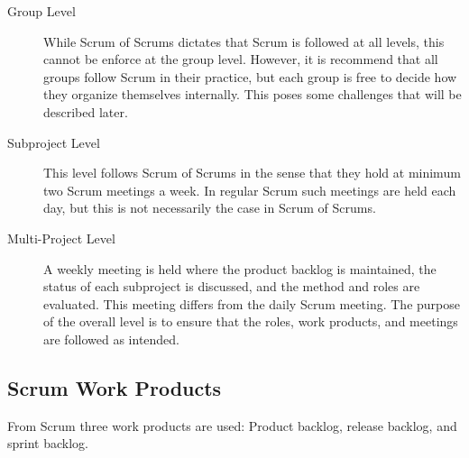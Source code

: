 \begin{description}
	\item[Group Level] While Scrum of Scrums dictates that Scrum is followed at all levels, this cannot be enforce at the group level. However, it is recommend that all groups follow Scrum in their practice, but each group is free to decide how they organize themselves internally. This poses some challenges that will be described later.
	\item[Subproject Level] This level follows Scrum of Scrums in the sense that they hold at minimum two Scrum meetings a week. In regular Scrum such meetings are held each day, but this is not necessarily the case in Scrum of Scrums.
	\item[Multi-Project Level] A weekly meeting is held where the product backlog is maintained, the status of each subproject is discussed, and the method and roles are evaluated. This meeting differs from the daily Scrum meeting. The purpose of the overall level is to ensure that the roles, work products, and meetings are followed as intended.
\end{description}

\subsection{Scrum Work Products}
From Scrum three work products are used: Product backlog, release backlog, and sprint backlog.

